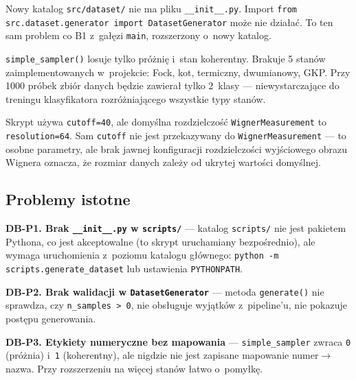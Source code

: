 \documentclass[12pt,a4paper]{article}
\begin{document}
\begin{warningbox}
Nowy katalog \texttt{src/dataset/} nie ma pliku \texttt{\_\_init\_\_.py}. Import \texttt{from src.dataset.generator import DatasetGenerator} może nie działać. To ten sam problem co B1 z~gałęzi \texttt{main}, rozszerzony o~nowy katalog.
\end{warningbox}

\begin{warningbox}
\texttt{simple\_sampler()} losuje tylko próżnię i~stan koherentny. Brakuje 5 stanów zaimplementowanych w~projekcie: Fock, kot, termiczny, dwumianowy, GKP. Przy 1000 próbek zbiór danych będzie zawierał tylko 2~klasy --- niewystarczające do treningu klasyfikatora rozróżniającego wszystkie typy stanów.
\end{warningbox}

\begin{warningbox}
Skrypt używa \texttt{cutoff=40}, ale domyślna rozdzielczość \texttt{WignerMeasurement} to \texttt{resolution=64}. Sam \texttt{cutoff} nie jest przekazywany do \texttt{WignerMeasurement} --- to osobne parametry, ale brak jawnej konfiguracji rozdzielczości wyjściowego obrazu Wignera oznacza, że rozmiar danych zależy od ukrytej wartości domyślnej.
\end{warningbox}

\subsection{Problemy istotne}

\textbf{DB-P1. Brak \texttt{\_\_init\_\_.py} w \texttt{scripts/}} --- katalog \texttt{scripts/} nie jest pakietem Pythona, co jest akceptowalne (to skrypt uruchamiany bezpośrednio), ale wymaga uruchomienia z~poziomu katalogu głównego: \texttt{python -m scripts.generate\_dataset} lub ustawienia \texttt{PYTHONPATH}.

\textbf{DB-P2. Brak walidacji w \texttt{DatasetGenerator}} --- metoda \texttt{generate()} nie sprawdza, czy \texttt{n\_samples > 0}, nie obsługuje wyjątków z~pipeline'u, nie pokazuje postępu generowania.

\textbf{DB-P3. Etykiety numeryczne bez mapowania} --- \texttt{simple\_sampler} zwraca \texttt{0} (próżnia) i~\texttt{1} (koherentny), ale nigdzie nie jest zapisane mapowanie numer$\to$nazwa. Przy rozszerzeniu na więcej stanów łatwo o~pomyłkę.
\end{document}
